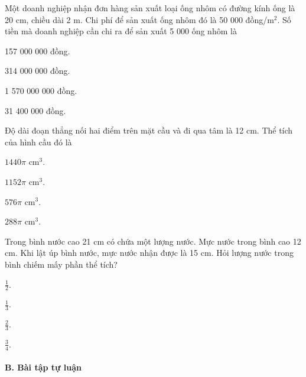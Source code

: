 \documentclass[%
    fontsize=12pt,%
    chapterprefix=false,%
    open=right,%
    twoside=false,%
    numbers=noenddot,%
    headings=optiontohead,%
    final,%
    DIV=15,%
    parskip=half %
]{scrbook}
\begin{document}
\begin{tracnghiem}
\item Một doanh nghiệp nhận đơn hàng sản xuất loại ống nhôm có đường kính ống là 20 cm, chiều dài 2 m. Chi phí để sản xuất ống nhôm đó là 50 000 đồng/m$^2$. Số tiền mà doanh nghiệp cần chi ra để sản xuất 5 000 ống nhôm là
\begin{options}
  \item 157 000 000 đồng.
  \item 314 000 000 đồng.
  \item 1 570 000 000 đồng.
  \item 31 400 000 đồng.
\end{options}

\item Độ dài đoạn thẳng nối hai điểm trên mặt cầu và đi qua tâm là 12 cm. Thể tích của hình cầu đó là
\begin{options}
  \item $1 440 \pi \text{ cm}^3$.
  \item $1 152 \pi \text{ cm}^3$.
  \item $576 \pi \text{ cm}^3$.
  \item $288 \pi \text{ cm}^3$.
\end{options}

\item Trong bình nước cao 21 cm có chứa một lượng nước. Mực nước trong bình cao 12 cm. Khi lật úp bình nước, mực nước nhận được là 15 cm. Hỏi lượng nước trong bình chiếm mấy phần thể tích?
\begin{options}
  \item $\frac{1}{2}$.
  \item $\frac{1}{3}$.
  \item $\frac{2}{3}$.
  \item $\frac{3}{4}$.
\end{options}

\end{tracnghiem}

\paragraph{B. Bài tập tự luận}
\end{document}
